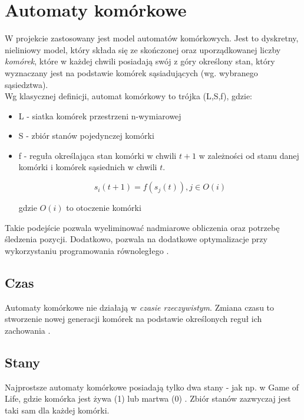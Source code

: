 \documentclass{article}
\begin{document}
\section{Automaty komórkowe}

W projekcie zastosowany jest model automatów komórkowych. Jest to dyskretny, nieliniowy model, który składa się ze skończonej oraz uporządkowanej liczby \textit{komórek}, które w każdej chwili posiadają swój z góry określony stan, który wyznaczany jest na podstawie komórek sąsiadujących (wg. wybranego sąsiedztwa). \\

Wg klasycznej definicji, automat komórkowy to trójka (L,S,f), gdzie:
\begin{itemize}
\item L - siatka komórek przestrzeni n-wymiarowej
\item S - zbiór stanów pojedynczej komórki
\item f - reguła określająca stan komórki w chwili $t+1$ w zależności od stanu danej komórki i komórek sąsiednich w chwili $t$.

$$
s_{i}(t+1) = f(s_{j}(t)), j \in O(i)
$$

gdzie $O(i)$ to otoczenie komórki
\end{itemize}

Takie podejście pozwala wyeliminować nadmiarowe obliczenia oraz potrzebę śledzenia pozycji. Dodatkowo, pozwala na dodatkowe optymalizacje przy wykorzystaniu programowania równoległego \cite{cellularAutomata}. \\


\subsection{Czas}
Automaty komórkowe nie działają w \textit{czasie rzeczywistym}. Zmiana czasu to stworzenie nowej generacji komórek na podstawie określonych reguł ich zachowania \cite{nature}.


\subsection{Stany}

Najprostsze automaty komórkowe posiadają tylko dwa stany - jak np. w Game of Life, gdzie komórka jest żywa (1) lub martwa (0) \cite{kulak}. Zbiór stanów zazwyczaj jest taki sam dla każdej komórki. 

	
\end{document}
